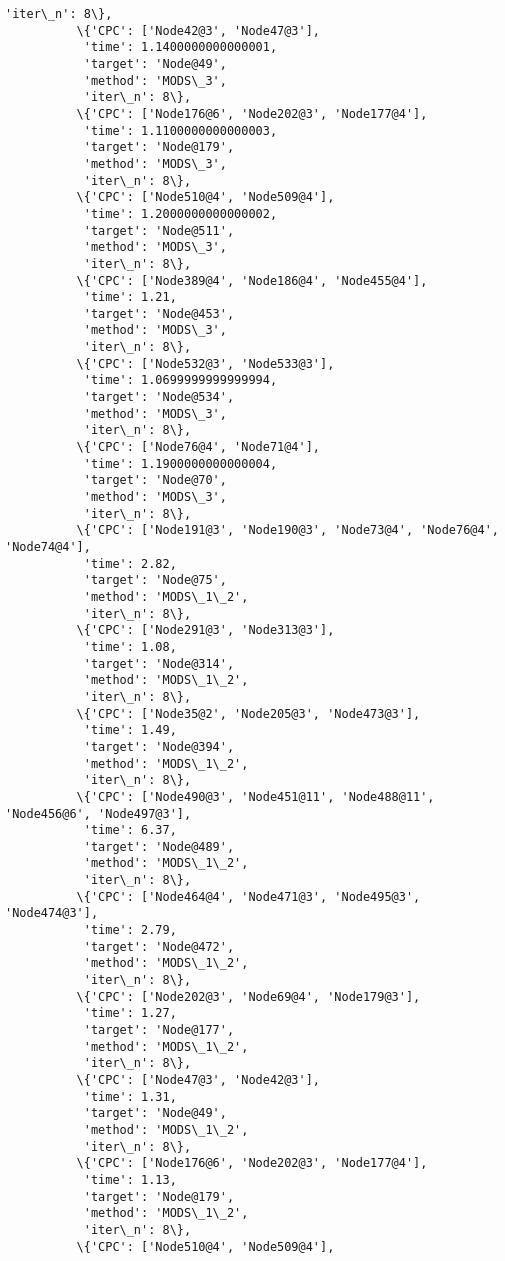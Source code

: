 \documentclass[11pt]{article}
\begin{document}
\begin{Verbatim}[commandchars=\\\{\}]
           'iter\_n': 8\},
          \{'CPC': ['Node42@3', 'Node47@3'],
           'time': 1.1400000000000001,
           'target': 'Node@49',
           'method': 'MODS\_3',
           'iter\_n': 8\},
          \{'CPC': ['Node176@6', 'Node202@3', 'Node177@4'],
           'time': 1.1100000000000003,
           'target': 'Node@179',
           'method': 'MODS\_3',
           'iter\_n': 8\},
          \{'CPC': ['Node510@4', 'Node509@4'],
           'time': 1.2000000000000002,
           'target': 'Node@511',
           'method': 'MODS\_3',
           'iter\_n': 8\},
          \{'CPC': ['Node389@4', 'Node186@4', 'Node455@4'],
           'time': 1.21,
           'target': 'Node@453',
           'method': 'MODS\_3',
           'iter\_n': 8\},
          \{'CPC': ['Node532@3', 'Node533@3'],
           'time': 1.0699999999999994,
           'target': 'Node@534',
           'method': 'MODS\_3',
           'iter\_n': 8\},
          \{'CPC': ['Node76@4', 'Node71@4'],
           'time': 1.1900000000000004,
           'target': 'Node@70',
           'method': 'MODS\_3',
           'iter\_n': 8\},
          \{'CPC': ['Node191@3', 'Node190@3', 'Node73@4', 'Node76@4', 'Node74@4'],
           'time': 2.82,
           'target': 'Node@75',
           'method': 'MODS\_1\_2',
           'iter\_n': 8\},
          \{'CPC': ['Node291@3', 'Node313@3'],
           'time': 1.08,
           'target': 'Node@314',
           'method': 'MODS\_1\_2',
           'iter\_n': 8\},
          \{'CPC': ['Node35@2', 'Node205@3', 'Node473@3'],
           'time': 1.49,
           'target': 'Node@394',
           'method': 'MODS\_1\_2',
           'iter\_n': 8\},
          \{'CPC': ['Node490@3', 'Node451@11', 'Node488@11', 'Node456@6', 'Node497@3'],
           'time': 6.37,
           'target': 'Node@489',
           'method': 'MODS\_1\_2',
           'iter\_n': 8\},
          \{'CPC': ['Node464@4', 'Node471@3', 'Node495@3', 'Node474@3'],
           'time': 2.79,
           'target': 'Node@472',
           'method': 'MODS\_1\_2',
           'iter\_n': 8\},
          \{'CPC': ['Node202@3', 'Node69@4', 'Node179@3'],
           'time': 1.27,
           'target': 'Node@177',
           'method': 'MODS\_1\_2',
           'iter\_n': 8\},
          \{'CPC': ['Node47@3', 'Node42@3'],
           'time': 1.31,
           'target': 'Node@49',
           'method': 'MODS\_1\_2',
           'iter\_n': 8\},
          \{'CPC': ['Node176@6', 'Node202@3', 'Node177@4'],
           'time': 1.13,
           'target': 'Node@179',
           'method': 'MODS\_1\_2',
           'iter\_n': 8\},
          \{'CPC': ['Node510@4', 'Node509@4'],

\end{Verbatim}
\end{document}
